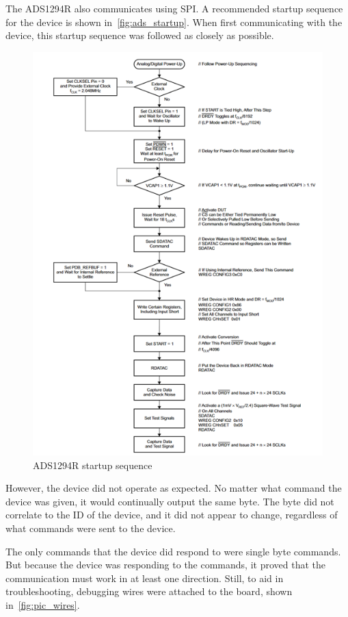 The ADS1294R also communicates using SPI.
A recommended startup sequence for the device is shown in~\autoref{fig:ads_startup}.
When first communicating with the device, this startup sequence was followed as closely as possible.

\begin{figure}[!ht]
  \caption{ADS1294R startup sequence}\label{fig:ads_startup}
  \centering
  \includegraphics[width=1\columnwidth/2]{chapters/development/results/ADS_Startup_Sequence}
\end{figure}

However, the device did not operate as expected.
No matter what command the device was given, it would continually output the same byte.
The byte did not correlate to the ID of the device, and it did not appear to change, regardless of what commands were sent to the device.

The only commands that the device did respond to were single byte commands.
But because the device was responding to the commands, it proved that the communication must work in at least one direction.
Still, to aid in troubleshooting, debugging wires were attached to the board, shown in~\autoref{fig:pic_wires}.

